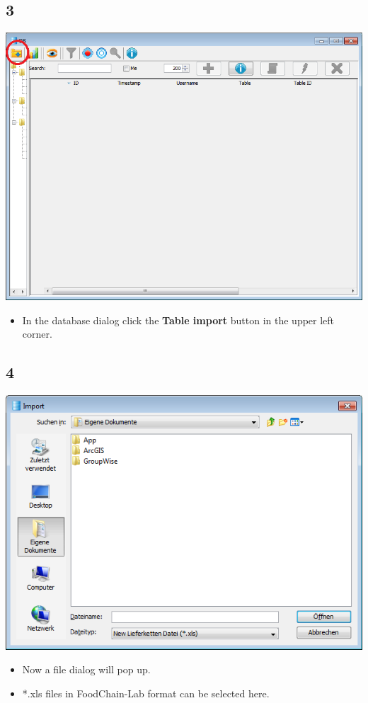 \documentclass{beamer}
\begin{document}
\subsection{3}
\begin{frame}
	\begin{center}
  		\includegraphics[height=0.6\textheight]{3.png}
	\end{center}
	\begin{itemize}
		\item In the database dialog click the \textbf{Table import} button in the upper left corner.
	\end{itemize}
\end{frame}

\subsection{4}
\begin{frame}
	\begin{center}
  		\includegraphics[height=0.6\textheight]{4.png}
	\end{center}
	\begin{itemize}
		\item Now a file dialog will pop up.
		\item *.xls files in FoodChain-Lab format can be selected here.
	\end{itemize}
\end{frame}
\end{document}
